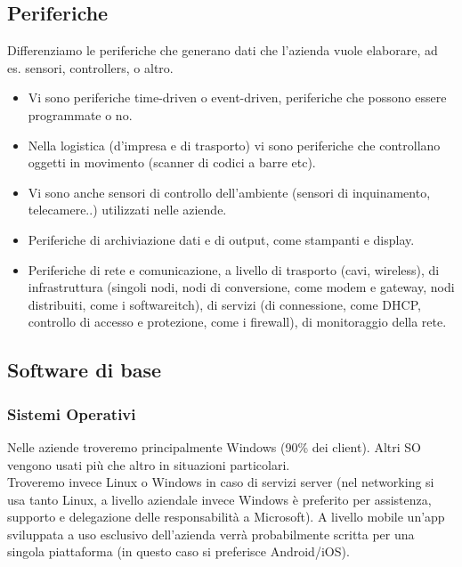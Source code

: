 \subsection{Periferiche}
Differenziamo le periferiche che generano dati che l'azienda vuole elaborare, ad es. sensori, controllers, o altro.
\begin{itemize}
  \item Vi sono periferiche time-driven o event-driven, periferiche che possono essere programmate o no.
  \item Nella logistica (d'impresa e di trasporto) vi sono periferiche che controllano oggetti in movimento (scanner di codici a barre etc).
  \item Vi sono anche sensori di controllo dell'ambiente (sensori di inquinamento, telecamere..) utilizzati nelle aziende.
  \item Periferiche di archiviazione dati e di output, come stampanti e display.
  \item Periferiche di rete e comunicazione, a livello di trasporto (cavi, wireless), di infrastruttura (singoli nodi, nodi di conversione, come modem e gateway, nodi distribuiti, come i softwareitch), di servizi (di connessione, come DHCP, controllo di accesso e protezione, come i firewall), di monitoraggio della rete.
\end{itemize}

\subsection{Software di base}
\subsubsection{Sistemi Operativi}
Nelle aziende troveremo principalmente Windows (90\% dei client). Altri SO vengono usati
pi\`u che altro in situazioni particolari. \\
Troveremo invece Linux o Windows in caso di servizi server (nel networking si usa tanto Linux, a livello
aziendale invece Windows \`e preferito per assistenza, supporto e delegazione delle responsabilit\`a a Microsoft).
A livello mobile un'app sviluppata a uso esclusivo dell'azienda verr\`a probabilmente scritta per una singola piattaforma (in questo caso si preferisce Android/iOS).

